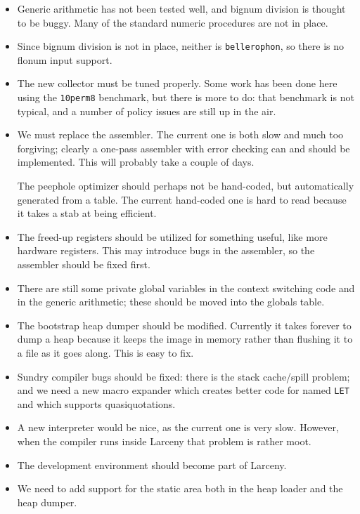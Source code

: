 \begin{itemize}
\item
Generic arithmetic has not been tested well, and bignum division is thought
to be buggy. Many of the standard numeric procedures are not in place.

\item
Since bignum division is not in place, neither is {\tt bellerophon}, so
there is no flonum input support.

\item
The new collector must be tuned properly. Some work has been done here using
the {\tt 10perm8} benchmark, but there is more to do: that benchmark is not
typical, and a number of policy issues are still up in the air.

\item
We must replace the assembler. The current one is both slow and much too
forgiving; clearly a one-pass assembler with error checking can and should
be implemented. This will probably take a couple of days.

The peephole optimizer should perhaps not be hand-coded, but automatically
generated from a table. The current hand-coded one is hard to read because
it takes a stab at being efficient.

\item
The freed-up registers should be utilized for something useful, like more
hardware registers. This may introduce bugs in the assembler, so the assembler
should be fixed first.

\item
There are still some private global variables in the context switching code
and in the generic arithmetic; these should be moved into the globals
table.

\item
The bootstrap heap dumper should be modified. Currently it takes forever
to dump a heap because it keeps the image in memory rather than flushing
it to a file as it goes along. This is easy to fix.

\item
Sundry compiler bugs should be fixed: there is the stack cache/spill problem;
and we need a new macro expander which creates better code for named {\tt LET}
and which supports quasiquotations.

\item
A new interpreter would be nice, as the current one is very slow. However,
when the compiler runs inside Larceny that problem is rather moot.

\item
The development environment should become part of Larceny.

\item
We need to add support for the static area both in the heap loader and the
heap dumper.

\end{itemize}

